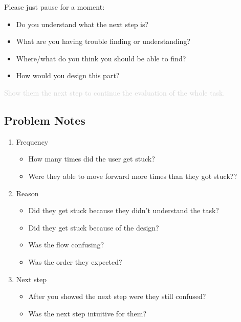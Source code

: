         \begin{itshape}
        Please just pause for a moment:
            \begin{itemize}
                \item Do you understand what the next step is?
                \item What are you having trouble finding or understanding?
                \item Where/what do you think you should be able to find?
                \item How would you design this part?
            \end{itemize}
        \end{itshape}

        \textcolor{lightgray}{Show them the next step to continue the evaluation of the whole task.}


    \subsection*{Problem Notes}
        \begin{enumerate}
            \item Frequency
                \begin{itemize}
                    \item How many times did the user get stuck?
                    \item Were they able to move forward more times than they got stuck??
                \end{itemize} 
            \item Reason    
                \begin{itemize}
                    \item Did they get stuck because they didn’t understand the task?
                    \item Did they get stuck because of the design?
                    \item Was the flow confusing?
                    \item Was the order they expected?
                \end{itemize} 
            \item Next step    
                \begin{itemize}
                    \item After you showed the next step were they still confused?
                    \item Was the next step intuitive for them?
                \end{itemize} 
        \end{enumerate}

